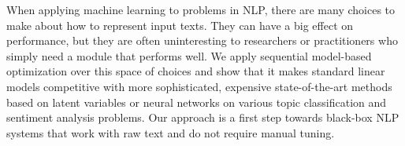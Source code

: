 When applying machine learning to problems in NLP, there are many choices to make about how to represent input texts.  They can have a big effect on performance, but they are often uninteresting to researchers or practitioners who simply need a module that performs well. We apply sequential model-based optimization over this space of choices and show that it makes standard linear models competitive with more sophisticated, expensive state-of-the-art methods based on latent variables or neural networks on various topic classification and sentiment analysis problems. Our approach is a first step towards black-box NLP systems that work with raw text and do not require manual tuning.
